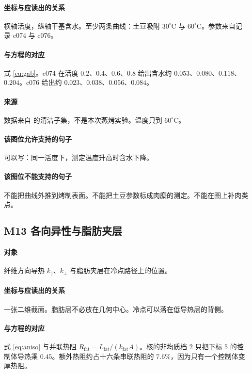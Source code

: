 \paragraph{坐标与应读出的关系}
横轴活度，纵轴干基含水。至少两条曲线：土豆吸附 $30^\circ\mathrm{C}$ 与 $60^\circ\mathrm{C}$。参数来自记录 c074 与 c076。

\paragraph{与方程的对应}
式 \eqref{eq:gab}。c074 在活度 $0.2$、$0.4$、$0.6$、$0.8$ 给出含水约 $0.053$、$0.080$、$0.118$、$0.204$。c076 给出约 $0.023$、$0.038$、$0.056$、$0.084$。

\paragraph{来源}
数据来自 \cite{sorption2026} 的清洁子集，不是本次蒸烤实验。温度只到 $60^\circ\mathrm{C}$。

\paragraph{该图位允许支持的句子}
可以写：同一活度下，测定温度升高时含水下降。

\paragraph{该图位不能支持的句子}
不能把曲线外推到烤制表面。不能把土豆参数标成肉糜的测定。不能在图上补肉类点。

\subsection{M13 各向异性与脂肪夹层}
\paragraph{对象}
纤维方向导热 $k_\parallel$、$k_\perp$ 与脂肪夹层在冷点路径上的位置。

\paragraph{坐标与应读出的关系}
一张二维截面。脂肪层不必放在几何中心。冷点可以落在低导热层的背侧。

\paragraph{与方程的对应}
式 \eqref{eq:aniso} 与并联热阻 $R_{\mathrm{fat}}=L_{\mathrm{fat}}/(k_{\mathrm{fat}}A)$。核的非均质档 2 只把下标 5 的控制体导热乘 $0.45$。额外热阻约占十六条串联热阻的 $7.6\%$，因为只有一个控制体变厚热阻。

